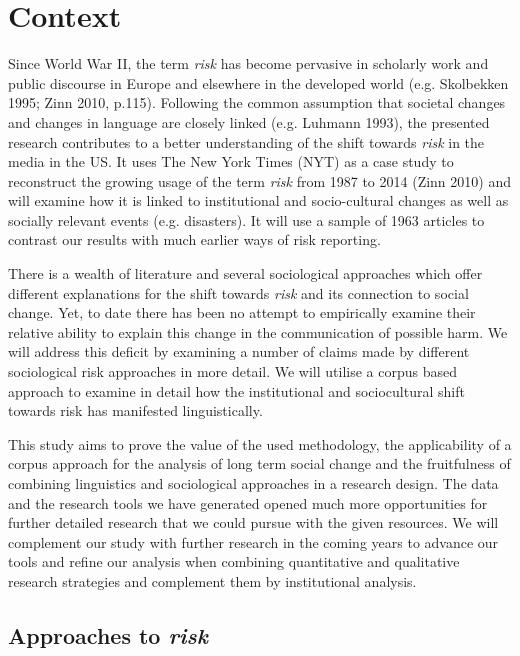 
\chapter{Context} %

Since World War II, the term \emph{risk} has become pervasive in scholarly work and public discourse in Europe and elsewhere in the developed world (e.g. Skolbekken 1995; Zinn 2010, p.115). Following the common assumption that societal changes and changes in language are closely linked (e.g. Luhmann 1993), the presented research contributes to a better understanding of the shift towards \emph{risk} in the media in the US. It uses The New York Times (NYT) as a case study to reconstruct the growing usage of the term \emph{risk} from 1987 to 2014 (Zinn 2010) and will examine how it is linked to institutional and socio-cultural changes as well as socially relevant events (e.g. disasters). It will use a sample of 1963 articles to contrast our results with much earlier ways of risk reporting. 

There is a wealth of literature and several sociological approaches which offer different explanations for the shift towards \emph{risk} and its connection to social change. Yet, to date there has been no attempt to empirically examine their relative ability to explain this change in the communication of possible harm. We will address this deficit by examining a number of claims made by different sociological risk approaches in more detail. We will utilise a corpus based approach to examine in detail how the institutional and sociocultural shift towards risk has manifested linguistically.

This study aims to prove the value of the used methodology, the applicability of a corpus approach for the analysis of long term social change and the fruitfulness of combining linguistics and sociological approaches in a research design. The data and the research tools we have generated opened much more opportunities for further detailed research that we could pursue with the given resources. We will complement our study with further research in the coming years to advance our tools and refine our analysis when combining quantitative and qualitative research strategies and complement them by institutional analysis.

\section{Approaches to \emph{risk}}

